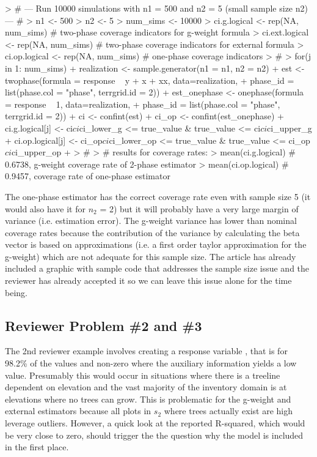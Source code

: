 \documentclass{article}
\begin{document}
\begin{small}
\begin{Schunk}
\begin{Sinput}
> # --- Run 10000 simulations with n1 = 500 and n2 = 5 (small sample size n2) --- #
> n1 <- 500
> n2 <- 5
> num_sims <- 10000
> ci.g.logical <- rep(NA, num_sims)   # two-phase coverage indicators for g-weight formula
> ci.ext.logical <- rep(NA, num_sims) # two-phase coverage indicators for external formula
> ci.op.logical <- rep(NA, num_sims)  # one-phase coverage indicators
> #
> for(j in 1: num_sims){
+   realization <- sample.generator(n1 = n1, n2 = n2)
+   est <- twophase(formula = response ~ y + x + xx, data=realization, 
+                   phase_id = list(phase.col = "phase", terrgrid.id = 2))
+   est_onephase <- onephase(formula = response ~ 1, data=realization, 
+                            phase_id = list(phase.col = "phase", terrgrid.id = 2))
+   ci <- confint(est)
+   ci_op <- confint(est_onephase)
+   ci.g.logical[j] <- ci$ci$ci_lower_g <= true_value & true_value <= ci$ci$ci_upper_g
+   ci.op.logical[j] <- ci_op$ci$ci_lower_op <= true_value & true_value <= ci_op$ci$ci_upper_op
+ }
> #
> # results for coverage rates:
> mean(ci.g.logical)   # 0.6738, g-weight coverage rate of 2-phase estimator
> mean(ci.op.logical)  # 0.9457, coverage rate of one-phase estimator
\end{Sinput}
\end{Schunk}
\end{small}

The one-phase estimator has the correct coverage rate even with sample size 5 (it would also have it for $n_2$ = 2) but it will probably have a very large margin of variance (i.e. estimation error). The g-weight variance has lower than nominal coverage rates because the contribution of the variance by calculating the beta vector is based on approximations (i.e. a first order taylor approximation for the g-weight) which are not adequate for this sample size.  The article has already included a graphic with sample code that addresses the sample size issue and the reviewer has already accepted it so we can leave this issue alone for the time being.


\subsection{Reviewer Problem \#2 and \#3}

The 2nd reviewer example involves creating a response variable , that is  for 98.2\% of the values and non-zero where the auxiliary information yields a low value.  Presumably this would occur in situations where there is a treeline dependent on elevation and the vast majority of the inventory domain is at elevations where no trees can grow.  This is problematic for the g-weight and external estimators because all plots in $s_2$ where trees actually exist are high leverage outliers. However, a quick look at the reported R-squared, which would be very close to zero, should trigger the  the question why the model is included in the first place.\\
\end{document}
